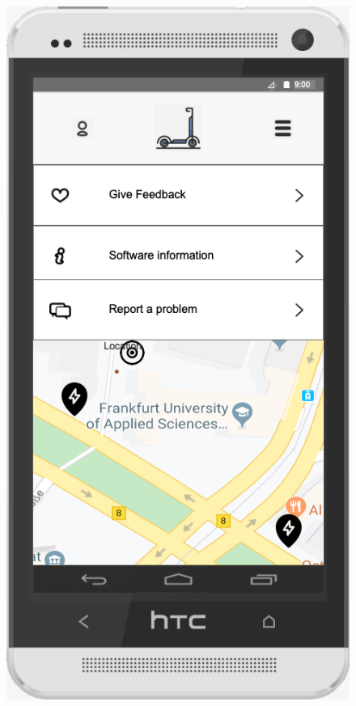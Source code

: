 \documentclass[a4paper, 12pt]{article}
\begin{document}
\begin{figure} [htbp]
    \begin{center}
        \begin{minipage}{0.45\textwidth}
            \begin{center}
                \includegraphics[scale=0.35]{images/prototypes/02-05-menu-dropdown--other.png}

\end{center}
\end{minipage}
\end{center}
\end{figure}
\end{document}
